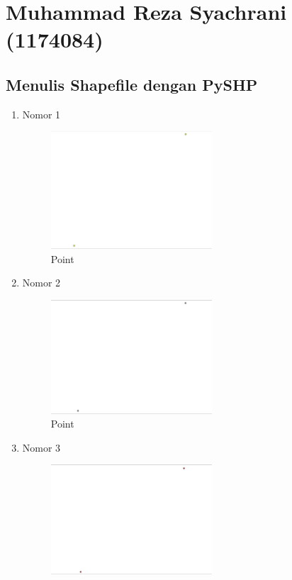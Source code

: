 \section{Muhammad Reza Syachrani (1174084)}
\subsection{Menulis Shapefile dengan PySHP}
\begin{enumerate}
	\item Nomor 1
	
	\begin{figure}[]
		\includegraphics[width=6cm]{figures/Tugas2/1174084/no1.png}
		\centering
		\caption{Point}
	\end{figure}
	\item Nomor 2
	
	\begin{figure}[H]
		\includegraphics[width=6cm]{figures/Tugas2/1174084/no2.png}
		\centering
		\caption{Point}
	\end{figure}
	\item Nomor 3
	
	\begin{figure}[H]
		\includegraphics[width=6cm]{figures/Tugas2/1174084/no3.png}

\end{figure}
\end{enumerate}
